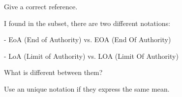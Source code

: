 \documentclass{template/openetcs_article}
\begin{document}
\resolution
Give a correct reference.

I found in the subset, there are two different notations:

- EoA (End of Authority) vs. EOA (End Of Authority)

- LoA (Limit of Authority) vs. LOA (Limit Of Authority)

What is different between them?

\resolution
Use an unique notation if they express the same mean.









\end{document}
